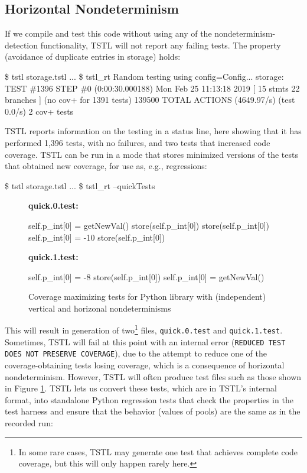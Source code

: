 \subsection{Horizontal Nondeterminism}

If we compile and test this code without using any of the
nondeterminism-detection functionality, TSTL will not report any
failing tests.  The property (avoidance of duplicate entries in
storage) holds:

{\scriptsize
\begin{code}
 \$ tstl storage.tstl
 ...
 \$ tstl\_rt
 Random testing using config=Config...
 storage: TEST \#1396 STEP \#0 (0:00:30.000188) Mon Feb
 25 11:13:18 2019 [ 15 stmts 22 branches ] (no cov+ for
 1391 tests) 139500 TOTAL ACTIONS (4649.97/s) (test
 0.0/s) 2 cov+ tests
\end{code}
}

TSTL reports information on the testing in a status line, here showing
that it has performed 1,396 tests, with no failures, and two tests
that increased code coverage.  TSTL can be run in a mode that stores
minimized versions of the tests that obtained new coverage, for use
as, e.g., regressions:

{\scriptsize
\begin{code}
 \$ tstl storage.tstl
 ...
 \$ tstl\_rt --quickTests
\end{code}
}

\begin{figure}
{\bf quick.0.test:}
\begin{code}
self.p\_int[0] = getNewVal() 
store(self.p\_int[0]) 
store(self.p\_int[0]) 
self.p\_int[0] = -10 
store(self.p\_int[0]) 
\end{code}
\vspace{0.1in}
{\bf quick.1.test:}
\begin{code}
self.p\_int[0] = -8
store(self.p\_int[0]) 
self.p\_int[0] = getNewVal() 
\end{code}
\caption{Coverage maximizing tests for Python library with (independent) vertical and
  horizonal nondeterminisms}
\label{fig:simpleexampletests}
\end{figure}

This will result in generation of two\footnote{In some rare cases,
  TSTL may generate one test that achieves complete code coverage, but
  this will only happen rarely here.} files, {\tt quick.0.test} and
{\tt quick.1.test}.  Sometimes, TSTL will fail at this point with an internal error
({\tt REDUCED TEST DOES NOT PRESERVE COVERAGE}), due to the attempt to reduce one of the coverage-obtaining
tests losing coverage, which is a consequence of horizontal
nondeterminism.  However, TSTL will often produce
test files such as those shown in Figure
\ref{fig:simpleexampletests}.  TSTL lets us convert these tests, which
are in TSTL's internal format, into standalone Python regression tests
that check the properties in the test harness and ensure that the
behavior (values of pools) are the same as in the recorded run:

